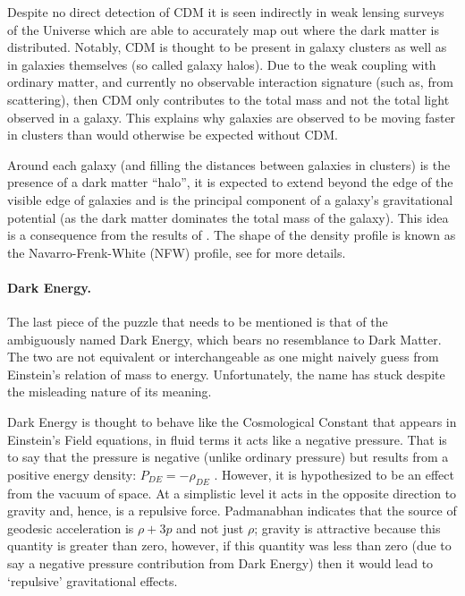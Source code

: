 Despite no direct detection of CDM it is seen indirectly in weak lensing surveys of the Universe which are able to accurately map out where the dark matter is distributed. Notably, CDM is thought to be present in galaxy clusters as well as in galaxies themselves (so called galaxy halos). Due to the weak coupling with ordinary matter, and currently no observable interaction signature (such as, from scattering), then CDM only contributes to the total mass and not the total light observed in a galaxy. This explains why galaxies are observed to be moving faster in clusters than would otherwise be expected without CDM. \citep{bib_pea, bib_nfw}

Around each galaxy (and filling the distances between galaxies in clusters) is the presence of a dark matter ``halo'', it is expected to extend beyond the edge of the visible edge of galaxies and is the principal component of a galaxy's gravitational potential (as the dark matter dominates the total mass of the galaxy). This idea is a consequence from the results of \citet{bib_rub}. The shape of the density profile is known as the Navarro-Frenk-White (NFW) profile, see \citet{bib_nfw} for more details.

\paragraph{Dark Energy.} The last piece of the puzzle that needs to be mentioned is that of the ambiguously named Dark Energy, which bears no resemblance to Dark Matter. The two are not equivalent or interchangeable as one might naively guess from Einstein's relation of mass to energy. Unfortunately, the name has stuck despite the misleading nature of its meaning.

Dark Energy is thought to behave like the Cosmological Constant \citep{bib_lah} that appears in Einstein's Field equations, in fluid terms it acts like a negative pressure. That is to say that the pressure is negative (unlike ordinary pressure) but results from a positive energy density: $P_{DE} = - \rho_{DE}$ \citep{bib_pad}. However, it is hypothesized to be an effect from the vacuum of space. At a simplistic level it acts in the opposite direction to gravity and, hence, is a repulsive force. Padmanabhan indicates that the source of geodesic acceleration is $\rho +3p$ and not just $\rho$; gravity is attractive because this quantity is greater than zero, however, if this quantity was less than zero (due to say a negative pressure contribution from Dark Energy) then it would lead to `repulsive' gravitational effects.


